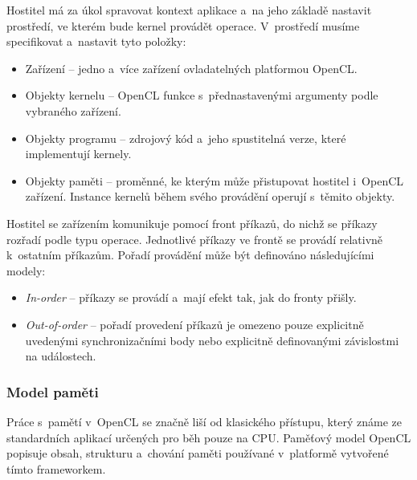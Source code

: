  Hostitel má za úkol spravovat kontext aplikace a~na jeho základě nastavit prostředí, ve
kterém bude kernel provádět operace. V~prostředí musíme specifikovat a~nastavit tyto položky:
\begin{itemize}
    \item Zařízení -- jedno a~více zařízení ovladatelných platformou OpenCL.
    \item Objekty kernelu -- OpenCL funkce s~přednastavenými argumenty podle vybraného
        zařízení.
    \item Objekty programu -- zdrojový kód a~jeho spustitelná verze, které implementují
        kernely.
    \item Objekty paměti -- proměnné, ke kterým může přistupovat hostitel i~OpenCL zařízení.
	Instance kernelů během svého provádění operují s~těmito objekty.
\end{itemize}
Hostitel se zařízením komunikuje pomocí front příkazů, do nichž se příkazy rozřadí podle
typu operace. Jednotlivé příkazy ve frontě se provádí relativně k~ostatním příkazům. Pořadí
provádění může být definováno následujícími modely:
\begin{itemize}
    \item {\it In-order} -- příkazy se provádí a~mají efekt tak, jak do fronty přišly.
    \item {\it Out-of-order} -- pořadí provedení příkazů je omezeno pouze explicitně uvedenými
        synchronizačními body nebo explicitně definovanými závislostmi na událostech.
\end{itemize}

\subsubsection{Model paměti}
Práce s~pamětí v~OpenCL se značně liší od klasického přístupu, který známe ze standardních
aplikací určených pro běh pouze na CPU. Paměťový model OpenCL popisuje obsah, strukturu a~chování
paměti používané v~platformě vytvořené tímto frameworkem.


